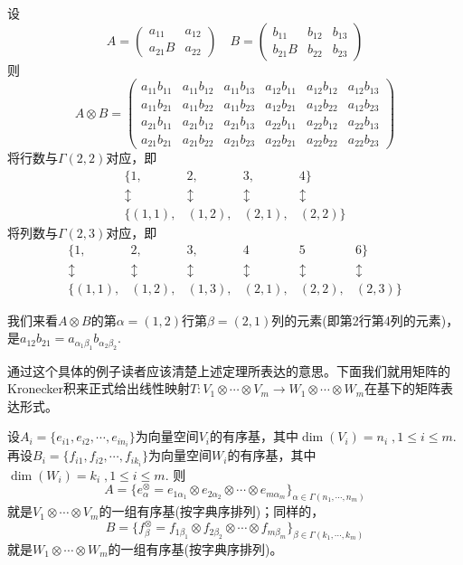 \begin{example}
	\label{chapter2确定Kronecker积元素的例子}
	设
	\[
	A=\left( \begin{array}{cc}{a_{11}} & {a_{12}}  \\ {a_{21}B} & {a_{22}} \end{array}\right)\quad B=\left( \begin{array}{ccc}{b_{11}} & {b_{12}} & {b_{13}} \\ {b_{21}B} & {b_{22}} & {b_{23}} \end{array}\right)
	\]
	则
	\[
	A\otimes B=\left( \begin{array}{cccccc}{a_{11}b_{11}} & {a_{11}b_{12}} & {a_{11}b_{13}} & {a_{12}b_{11}} &{a_{12}b_{12}}& {a_{12}b_{13}}\\ {a_{11}b_{21}} & {a_{11}b_{22}} & {a_{11}b_{23}} & {a_{12}b_{21}} &{a_{12}b_{22}}& {a_{12}b_{23}}\\{a_{21}b_{11}} & {a_{21}b_{12}} & {a_{21}b_{13}} & {a_{22}b_{11}} &{a_{22}b_{12}}& {a_{22}b_{13}}\\ {a_{21}b_{21}} & {a_{21}b_{22}} & {a_{21}b_{23}} & {a_{22}b_{21}} &{a_{22}b_{22}}& {a_{22}b_{23}}
	\end{array}\right)
	\]
	将行数与$\Gamma(2,2)$对应，即
	\[
	\begin{array}{cccccccc}\{{1,} & {2}, & {3}, & {4}\} \\{\updownarrow} & {\updownarrow} & {\updownarrow} &{\updownarrow}\\ \{{(1,1)}, & {(1,2)}, & {(2,1)}, & {(2,2)}\}\end{array}
	\]
	将列数与$\Gamma(2,3)$对应，即
	\[
	\begin{array}{cccccccc}\{{1,} & {2}, & {3}, & {4} &{5}&{6}  \} \\{\updownarrow} & {\updownarrow} & {\updownarrow} &{\updownarrow}&{\updownarrow}&{\updownarrow}\\ \{{(1,1)}, & {(1,2)},& {(1,3)}, & {(2,1)}, & {(2,2)}, & {(2,3)}\}\end{array}
	\]
	
	我们来看$A\otimes B$的第$\alpha=(1,2)$行第$\beta=(2,1)$列的元素(即第2行第4列的元素)，是$a_{12}b_{21}=a_{\alpha_{1}\beta_{ 1 }}b_{\alpha_{ 2 }\beta_{ 2 }}$. 
\end{example}

通过这个具体的例子读者应该清楚上述定理所表达的意思。下面我们就用矩阵的Kronecker积来正式给出线性映射$T:V_{1}\otimes\cdots\otimes V_{m}\longrightarrow W_{1}\otimes\cdots\otimes W_{m}$在基下的矩阵表达形式。

设$A_{i}=\{e_{i1},e_{i2},\cdots,e_{in_{i}} \}$为向量空间$V_{i}$的有序基，其中$\operatorname{dim}(V_{i})=n_{i}\;,1\leqslant i\leqslant m$. 再设$B_{i}=\{f_{i1},f_{i2},\cdots,f_{ik_{i}} \}$为向量空间$W_{i}$的有序基，其中$\operatorname{dim}(W_{i})=k_{i}\;,1\leqslant i\leqslant m$. 则
\[
A=\{e^{\otimes}_{\alpha}=e_{1\alpha_{ 1 }}\otimes e_{2\alpha_{ 2 }}\otimes\cdots\otimes e_{m\alpha_{ m }} \}_{\alpha\in \Gamma(n_{1},\cdots,n_{m})}
\]
就是$V_{1}\otimes \cdots\otimes V_{m}$的一组有序基(按字典序排列)；同样的，
\[
B=\{f^{\otimes}_{\beta}=f_{1\beta_{ 1 }}\otimes f_{2\beta_{ 2 }}\otimes\cdots\otimes f_{m\beta_{ m }} \}_{\beta\in \Gamma(k_{1},\cdots,k_{m})}
\]
就是$W_{1}\otimes \cdots\otimes W_{m}$的一组有序基(按字典序排列)。

